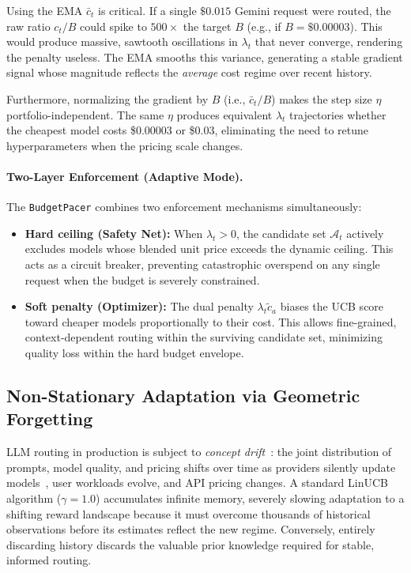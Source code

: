 Using the EMA $\bar{c}_t$ is critical. If a single $\$0.015$ Gemini request were routed, the raw ratio $c_t/B$ could spike to $500\times$ the target $B$ (e.g., if $B=\$0.00003$). This would produce massive, sawtooth oscillations in $\lambda_t$ that never converge, rendering the penalty useless. The EMA smooths this variance, generating a stable gradient signal whose magnitude reflects the \emph{average} cost regime over recent history. 

Furthermore, normalizing the gradient by $B$ (i.e., $\bar{c}_t / B$) makes the step size $\eta$ portfolio-independent. The same $\eta$ produces equivalent $\lambda_t$ trajectories whether the cheapest model costs \$0.00003 or \$0.03, eliminating the need to retune hyperparameters when the pricing scale changes.

\paragraph{Two-Layer Enforcement (Adaptive Mode).}
The \texttt{BudgetPacer} combines two enforcement mechanisms simultaneously:
\begin{itemize}[nosep,leftmargin=*]
  \item \textbf{Hard ceiling (Safety Net):} When $\lambda_t > 0$, the candidate set $\mathcal{A}_t$ actively excludes models whose blended unit price exceeds the dynamic ceiling. This acts as a circuit breaker, preventing catastrophic overspend on any single request when the budget is severely constrained.
  \item \textbf{Soft penalty (Optimizer):} The dual penalty $\lambda_t\tilde{c}_a$ biases the UCB score toward cheaper models proportionally to their cost. This allows fine-grained, context-dependent routing within the surviving candidate set, minimizing quality loss within the hard budget envelope.
\end{itemize}

\subsection{Non-Stationary Adaptation via Geometric Forgetting}
\label{sec:forgetting}

LLM routing in production is subject to \emph{concept drift}~\cite{gama2014survey}: the joint distribution of prompts, model quality, and pricing shifts over time as providers silently update models~\cite{chen2023chatgptdrift,chen2025silent}, user workloads evolve, and API pricing changes.
A standard LinUCB algorithm ($\gamma=1.0$) accumulates infinite memory, severely slowing adaptation to a shifting reward landscape because it must overcome thousands of historical observations before its estimates reflect the new regime. Conversely, entirely discarding history discards the valuable prior knowledge required for stable, informed routing.

